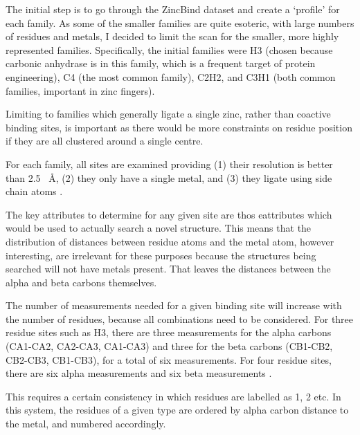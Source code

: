 The initial step is to go through the ZincBind dataset and create a `profile' for each family. As some of the smaller families are quite esoteric, with large numbers of residues and metals, I decided to limit the scan for the smaller, more highly represented families. Specifically, the initial families were H3 (chosen because carbonic anhydrase is in this family, which is a frequent target of protein engineering), C4 (the most common family), C2H2, and C3H1 (both common families, important in zinc fingers).

Limiting to families which generally ligate a single zinc, rather than coactive binding sites, is important as there would be more constraints on residue position if they are all clustered around a single centre.

For each family, all sites are examined providing (1) their resolution is better than 2.5 ~{\AA}, (2) they only have a single metal, and (3) they ligate using side chain atoms .

The key attributes to determine for any given site are thos eattributes which would be used to actually search a novel structure. This means that the distribution of distances between residue atoms and the metal atom, however interesting, are irrelevant for these purposes because the structures being searched will not have metals present. That leaves the distances between the alpha and beta carbons themselves.

The number of measurements needed for a given binding site will increase with the number of residues, because all combinations need to be considered. For three residue sites such as H3, there are three measurements for the alpha carbons (CA1-CA2, CA2-CA3, CA1-CA3) and three for the beta carbons (CB1-CB2, CB2-CB3, CB1-CB3), for a total of six measurements. For four residue sites, there are six alpha measurements and six beta measurements .

This requires a certain consistency in which residues are labelled as 1, 2 etc. In this system, the residues of a given type are ordered by alpha carbon distance to the metal, and numbered accordingly.